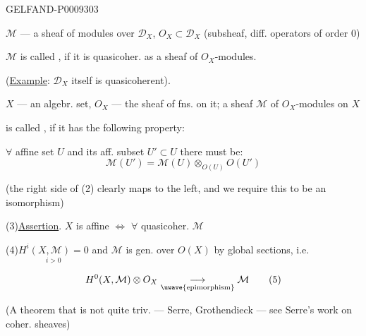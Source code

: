 \begin{GelfandAdjacentEvidence}{GELFAND-P000930}{3}


$\mathcal M$ --- a sheaf of modules over $\mathcal D_X$, $O_X\subset\mathcal D_X$ (subsheaf, diff. operators of order 0)

$\mathcal M$ is called , if it is quasicoher. as a sheaf of $O_X$-modules.

(\underline{Example}: $\mathcal D_X$ itself is quasicoherent).

$X$ --- an algebr. set, $O_X$ --- the sheaf of fns. on it; a sheaf $\mathcal M$ of $O_X$-modules on $X$

is called , if it has the following property:

\(\forall\) affine set $U$ and its aff. subset \(U'\subset U\) there must be:
\begin{equation*}
 \mathcal M(U')=\mathcal M(U)\otimes_{O(U)}O(U')
 \tag{2}
\end{equation*}

(the right side of (2) clearly maps to the left, and we require this to be an isomorphism)

(3)\quad \underline{Assertion}. $X$ is affine \(\Longleftrightarrow\) \(\forall\) quasicoher. $\mathcal M$

(4)\quad \(\underset{i>0}{H^i(X,\mathcal M)=0}\) and $\mathcal M$ is gen. over $O(X)$ by global sections, i.e.
\end{GelfandAdjacentEvidence}


\begin{equation*}
 H^0(X,\mathcal M)\otimes O_X
 \underset{\text{\uwave{epimorphism}}}{\longrightarrow}\mathcal M
 \tag{5}
\end{equation*}

(A theorem that is not quite triv. --- Serre, Grothendieck --- see Serre's work on coher. sheaves)


